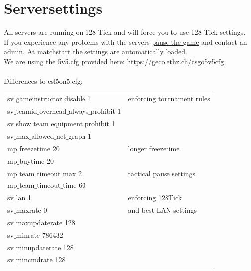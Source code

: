 \documentclass{article}
\begin{document}
\section{Serversettings}
All servers are running on 128 Tick and will force you to use 128 Tick settings.\\
If you experience any problems with the servers \hyperref[sec:pause]{pause the game} and contact an admin. At matchstart the settings are automatically loaded.\\
We are using the 5v5.cfg provided here:
\url{https://geco.ethz.ch/csgo5v5cfg} \\\\
Differences to esl5on5.cfg:\\
\begin{tabular}{ | l | l | }
	\hline			
	sv$\_$gameinstructor$\_$disable 1 & enforcing tournament rules\\
	sv$\_$teamid$\_$overhead$\_$always$\_$prohibit 1 & \\
	sv$\_$show$\_$team$\_$equipment$\_$prohibit 1 & \\
	sv$\_$max$\_$allowed$\_$net$\_$graph 1 &  \\
	\hline
	mp$\_$freezetime 20 & longer freezetime\\
	mp$\_$buytime 20 & \\
	\hline
	mp$\_$team$\_$timeout$\_$max 2 & tactical pause settings\\
	mp$\_$team$\_$timeout$\_$time 60 & \\
	\hline
	sv$\_$lan 1 & enforcing 128Tick  \\
	sv$\_$maxrate 0 & and best LAN settings \\
	sv$\_$maxupdaterate 128 & \\
	sv$\_$minrate 786432 & \\
	sv$\_$minupdaterate 128 & \\
	sv$\_$mincmdrate 128 & \\
	\hline  
\end{tabular}
\end{document}
